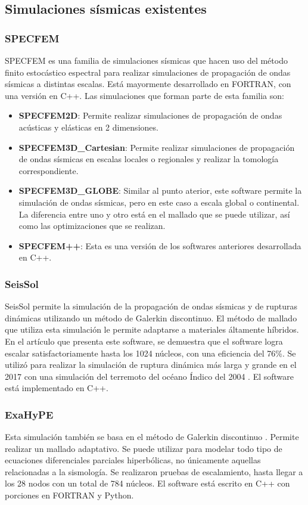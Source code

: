 \subsection{Simulaciones sísmicas existentes}
\subsubsection{SPECFEM}
SPECFEM \cite{Peter_Forward_and_adjoint_2011} es una familia de simulaciones sísmicas que hacen uso del método finito estocástico espectral para realizar simulaciones de propagación de ondas sísmicas a distintas escalas. Está mayormente desarrollado en FORTRAN, con una versión en C++.
Las simulaciones que forman parte de esta familia son:
\begin{itemize}
  \item \textbf{SPECFEM2D}: Permite realizar simulaciones de propagación de ondas acústicas y elásticas en 2 dimensiones.
  \item \textbf{SPECFEM3D\_Cartesian}: Permite realizar simulaciones de propagación de ondas sísmicas en escalas locales o regionales y realizar la tomología correspondiente.
  \item \textbf{SPECFEM3D\_GLOBE}: Similar al punto aterior, este software permite la simulación de ondas sísmicas, pero en este caso a escala global o continental. La diferencia entre uno y otro está en el mallado que se puede utilizar, así como las optimizaciones que se realizan.
  \item \textbf{SPECFEM++}: Esta es una versión de los softwares anteriores desarrollada en C++. \end{itemize}
\subsubsection{SeisSol}
SeisSol \cite{Kser2010} permite la simulación de la propagación de ondas sísmicas y de rupturas dinámicas utilizando un método de Galerkin discontinuo. El método de mallado que utiliza esta simulación le permite adaptarse a materiales áltamente híbridos. En el artículo que presenta este software, se demuestra que el software logra escalar satisfactoriamente hasta los 1024 núcleos, con una eficiencia del 76\%. Se utilizó para realizar la simulación de ruptura dinámica más larga y grande en el 2017 con una simulación del terremoto del océano Índico del 2004 \cite{Uphoff2017}. El software está implementado en C++.

\subsubsection{ExaHyPE}
  Esta simulación también se basa en el método de Galerkin discontinuo \cite{Reinarz2020}. Permite realizar un mallado adaptativo. Se puede utilizar para modelar todo tipo de ecuaciones diferenciales parciales hiperbólicas, no únicamente aquellas relacionadas a la sismología. Se realizaron pruebas de escalamiento, hasta llegar a los 28 nodos con un total de 784 núcleos. El software está escrito en C++ con porciones en FORTRAN y Python.
